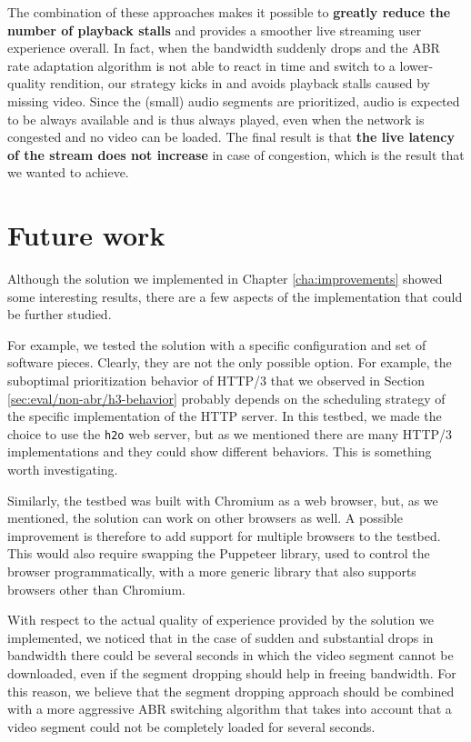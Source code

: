 The combination of these approaches makes it possible to \textbf{greatly reduce the number of playback stalls} and provides a smoother live streaming user experience overall. In fact, when the bandwidth suddenly drops and the ABR rate adaptation algorithm is not able to react in time and switch to a lower-quality rendition, our strategy kicks in and avoids playback stalls caused by missing video. Since the (small) audio segments are prioritized, audio is expected to be always available and is thus always played, even when the network is congested and no video can be loaded. The final result is that \textbf{the live latency of the stream does not increase} in case of congestion, which is the result that we wanted to achieve.

\section{Future work}
\label{sec:conclusions/future}

Although the solution we implemented in Chapter \ref{cha:improvements} showed some interesting results, there are a few aspects of the implementation that could be further studied.

For example, we tested the solution with a specific configuration and set of software pieces. Clearly, they are not the only possible option. For example, the suboptimal prioritization behavior of HTTP/3 that we observed in Section \ref{sec:eval/non-abr/h3-behavior} probably depends on the scheduling strategy of the specific implementation of the HTTP server. In this testbed, we made the choice to use the \texttt{h2o} web server, but as we mentioned there are many HTTP/3 implementations and they could show different behaviors. This is something worth investigating.

Similarly, the testbed was built with Chromium as a web browser, but, as we mentioned, the solution can work on other browsers as well. A possible improvement is therefore to add support for multiple browsers to the testbed. This would also require swapping the Puppeteer library, used to control the browser programmatically, with a more generic library that also supports browsers other than Chromium.

With respect to the actual quality of experience provided by the solution we implemented, we noticed that in the case of sudden and substantial drops in bandwidth there could be several seconds in which the video segment cannot be downloaded, even if the segment dropping should help in freeing bandwidth. For this reason, we believe that the segment dropping approach should be combined with a more aggressive ABR switching algorithm that takes into account that a video segment could not be completely loaded for several seconds.

